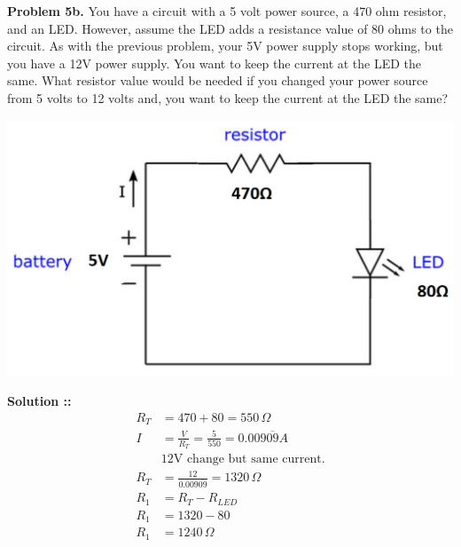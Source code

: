 \documentclass[11pt]{article}
\begin{document}
\textbf{Problem 5b.} You have a circuit with a 5 volt power source, a 470 ohm
resistor, and an LED. However, assume the LED adds a resistance value of 80
ohms to the circuit. As with the previous problem, your 5V power supply stops
working, but you have a 12V power supply. You want to keep the current at the
LED the same. What resistor value would be needed if you changed your power
source from 5 volts to 12 volts and, you want to keep the current at the LED
the same?
\begin{center}
    \includegraphics[scale=0.2]{5b.png}
\end{center}
\vspace{5px}\textbf{Solution ::}
\begin{align}
    R_T &= 470 + 80 = 550\,\Omega \\
    I &= \frac{V}{R_T} = \frac{5}{550} = 0.009\overline{09}A \\
    &\text{12V change but same current.} \\
    R_T &= \frac{12}{0.009\overline{09}} = 1320\,\Omega \\
    R_{1} &= R_{T} - R_{LED} \\
    R_{1} &= 1320 - 80 \\
    R_{1} &= 1240\,\Omega
\end{align}
\end{document}
